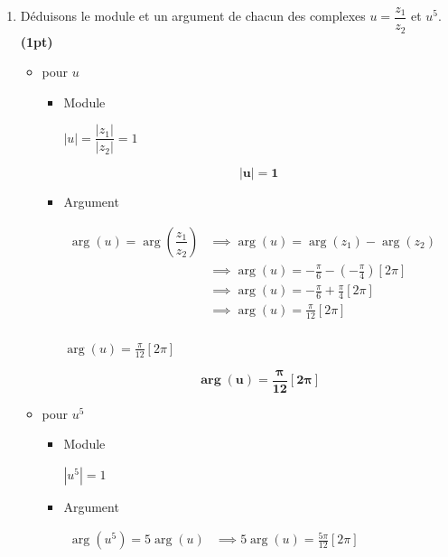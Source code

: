 \documentclass[12pt,a4paper]{article}
\begin{document}
\begin{enumerate}
\begin{enumerate}
\begin{itemize}
\begin{itemize}
\end{itemize}
\end{itemize}       
        
        \item Déduisons le module et un argument de chacun des complexes $u = \dfrac{z_1}{z_2}$ et $u^5$. \hfill \textbf{(1pt)}

\begin{itemize}

\item pour $u$

\begin{itemize}
\item Module

 $|u|=\dfrac{|z_1|}{|z_2|}= 1$

\begin{resultbox}
    \[
    \mathbf{ |u|= 1 }
    \]
\end{resultbox}

\item Argument

$
\begin{aligned}
\arg(u) = \arg\left( \dfrac{z_1}{z_2} \right)  &\implies \arg(u) =\arg(z_1)-\arg(z_2) \\
                                               &\implies \arg(u) =-\frac{\pi}{6}-\left( -\frac{\pi}{4} \right) [2\pi]\\
                                               &\implies \arg(u) =-\frac{\pi}{6}+\frac{\pi}{4} [2\pi]\\
                                               &\implies \arg(u) =\frac{\pi}{12} [2\pi]\\
\end{aligned}
$

 $\arg(u) =\frac{\pi}{12} [2\pi]$

 \begin{resultbox}
    \[
    \mathbf{ \arg(u) =\frac{\pi}{12} [2\pi] }
    \]
\end{resultbox}
 
\end{itemize}

\item pour $u^5$

\begin{itemize}
\item Module

 $|u^5|= 1$

\item Argument

$
\begin{aligned}
\arg(u^{5}) = 5\arg(u)   &\implies 5\arg(u) =\frac{5\pi}{12} [2\pi]\\
\end{aligned}
$


\end{itemize}
\end{itemize}
\end{enumerate}
\end{enumerate}
\end{document}
